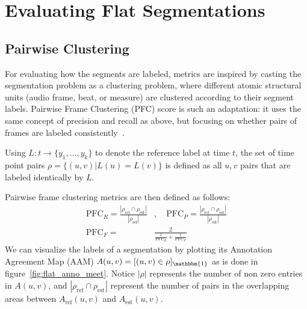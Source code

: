 
\section{Evaluating Flat Segmentations}
\subsection{Pairwise Clustering}
For evaluating how the segments are labeled, metrics are inspired by casting the segmentation problem as a clustering problem, where different atomic structural units (audio frame, beat, or measure) are clustered according to their segment labels.
Pairwise Frame Clustering (PFC) score is such an adaptation: it uses the same concept of precision and recall as above, but focusing on whether pairs of frames are labeled consistently~\cite{levy2008structural}.

Using $L: t \rightarrow \{y_1, \ldots, y_k\}$ to denote the reference label at time $t$, the set of time point pairs $\rho = \{(u, v)|L(u)=L(v)\}$ is defined as all $u, v$ pairs that are labeled identically by $L$.

Pairwise frame clustering metrics are then defined as follows: 
\begin{align*}
\text{PFC}_R = \frac{|\rho_\text{ref} \cap \rho_\text{est}|}{|\rho_\text{ref}|}&, \quad
\text{PFC}_P = \frac{|\rho_\text{ref} \cap \rho_\text{est}|}{|\rho_\text{est}|} \\
\text{PFC}_F = &\frac{2}{\frac1{\text{PFC}_R} + \frac1{\text{PFC}_P}}
\end{align*}
We can visualize the labels of a segmentation by plotting its Annotation Agreement Map (AAM) $A(u, v) = [(u, v) \in \rho]_\mathbbm{1}$ as is done in figure~\ref{fig:flat_anno_meet}.
Notice $|\rho|$ represents the number of non zero entries in $A(u, v)$, and $|\rho_\text{ref} \cap \rho_\text{est}|$ represent the number of pairs in the overlapping areas between $A_\text{ref}(u, v)$ and $A_\text{est}(u, v)$.


